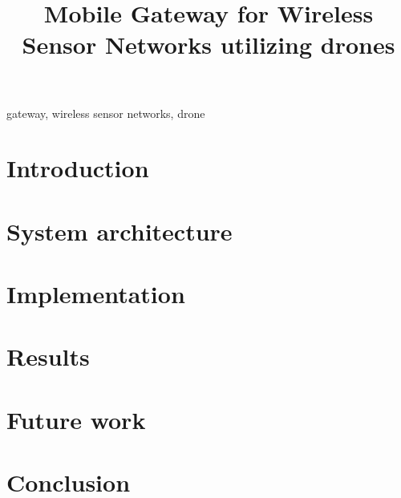 \documentclass[conference]{IEEEtran}
\begin{document}
\title{Mobile Gateway for Wireless Sensor Networks utilizing drones}

\author{
  }
 
\maketitle

\begin{abstract} 

\end{abstract}

\begin{IEEEkeywords}
gateway, wireless sensor networks, drone
\end{IEEEkeywords}

\section{Introduction}
\label{sec:introduction}


\section{System architecture}
\label{sec:architecture}


\section{Implementation}
\label{sec:implementation}



\section{Results} 
\label{sec:results}


\section{Future work} 
\label{sec:future}


\section{Conclusion}
\label{sec:conclusion}






\end{document}
